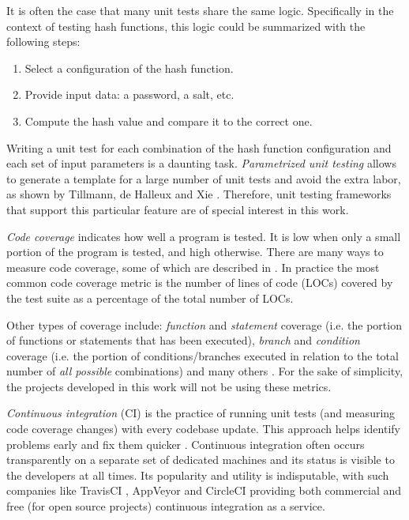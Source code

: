 It is often the case that many unit tests share the same logic. Specifically in the context of testing hash functions, this logic could be summarized with the following steps:

\begin{enumerate}
    \item Select a configuration of the hash function.
    \item Provide input data: a password, a salt, etc.
    \item Compute the hash value and compare it to the correct one.
   \end{enumerate}

Writing a unit test for each combination of the hash function configuration and each set of input parameters is a daunting task. \emph{Parametrized unit testing} allows to generate a template for a large number of unit tests and avoid the extra labor, as shown by Tillmann, de Halleux and Xie \cite{tillmann:2010:parametrized-unit-tests-rock}. Therefore, unit testing frameworks that support this particular feature are of special interest in this work.

\emph{Code coverage} indicates how well a program is tested. It is low when only a small portion of the program is tested, and high otherwise. There are many ways to measure code coverage, some of which are described in \cite{elberzhager:2012:reducing-effort}. In practice the most common code coverage metric is the number of lines of code (LOCs) covered by the test suite as a percentage of the total number of LOCs.

Other types of coverage include: \emph{function} and \emph{statement} coverage (i.e. the portion of functions or statements that has been executed), \emph{branch} and \emph{condition} coverage (i.e. the portion of conditions/branches executed in relation to the total number of \emph{all possible} combinations) and many others \cite{Astels:2003:TDD:864016}. For the sake of simplicity, the projects developed in this work will not be using these metrics.

\emph{Continuous integration} (CI) is the practice of running unit tests (and measuring code coverage changes) with every codebase update. This approach helps identify problems early and fix them quicker \cite{williams:2010:unit-tests-rock}. Continuous integration often occurs transparently on a separate set of dedicated machines and its status is visible to the developers at all times. Its popularity and utility is indisputable, with such companies like TravisCI \cite{travis:2017:homepage}, AppVeyor \cite{appveyor:2017:homepage} and CircleCI \cite{circleci:2017:homepage} providing both commercial and free (for open source projects) continuous integration as a service.
